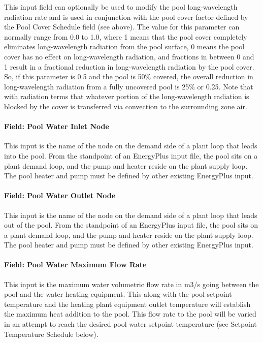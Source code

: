 This input field can optionally be used to modify the pool long-wavelength radiation rate and is used in conjunction with the pool cover factor defined by the Pool Cover Schedule field (see above). The value for this parameter can normally range from 0.0 to 1.0, where 1 means that the pool cover completely eliminates long-wavelength radiation from the pool surface, 0 means the pool cover has no effect on long-wavelength radiation, and fractions in between 0 and 1 result in a fractional reduction in long-wavelength radiation by the pool cover. So, if this parameter is 0.5 and the pool is 50\% covered, the overall reduction in long-wavelength radiation from a fully uncovered pool is 25\% or 0.25. Note that with radiation terms that whatever portion of the long-wavelength radiation is blocked by the cover is transferred via convection to the surrounding zone air.

\paragraph{Field: Pool Water Inlet Node}\label{field-pool-water-inlet-node}

This input is the name of the node on the demand side of a plant loop that leads into the pool. From the standpoint of an EnergyPlus input file, the pool sits on a plant demand loop, and the pump and heater reside on the plant supply loop. The pool heater and pump must be defined by other existing EnergyPlus input.

\paragraph{Field: Pool Water Outlet Node}\label{field-pool-water-outlet-node}

This input is the name of the node on the demand side of a plant loop that leads out of the pool. From the standpoint of an EnergyPlus input file, the pool sits on a plant demand loop, and the pump and heater reside on the plant supply loop. The pool heater and pump must be defined by other existing EnergyPlus input.

\paragraph{Field: Pool Water Maximum Flow Rate}\label{field-pool-water-maximum-flow-rate}

This input is the maximum water volumetric flow rate in m3/s going between the pool and the water heating equipment. This along with the pool setpoint temperature and the heating plant equipment outlet temperature will establish the maximum heat addition to the pool. This flow rate to the pool will be varied in an attempt to reach the desired pool water setpoint temperature (see Setpoint Temperature Schedule below).

